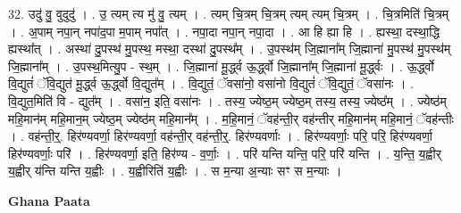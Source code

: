 \documentclass[17pt]{extarticle}
\begin{document}
32. उदु॑ वु॒ वुदुदु॑ । . उ॒ त्यम् त्य मु॑ वु॒ त्यम् । . त्यम् चि॒त्रम् चि॒त्रम् त्यम् त्यम् चि॒त्रम् । . चि॒त्रमिति॑ चि॒त्रम् । . अ॒पाम् नपा॒न् नपा॑द॒पा म॒पाम् नपा᳚त् । . नपा॒दा नपा॒न् नपा॒दा । . आ हि ह्या हि । . ह्यस्था॒ दस्था॒द्धि ह्यस्था᳚त् । . अस्था॑ दु॒पस्थ॑ मु॒पस्थ॒ मस्था॒ दस्था॑ दु॒पस्थ᳚म् । . उ॒पस्थ॑म् जि॒ह्माना᳚म् जि॒ह्माना॑ मु॒पस्थ॑ मु॒पस्थ॑म् जि॒ह्माना᳚म् । . उ॒पस्थ॒मित्यु॒प - स्थ॒म् । . जि॒ह्माना॑ मू॒र्द्ध्व ऊ॒र्द्ध्वो जि॒ह्माना᳚म् जि॒ह्माना॑ मू॒र्द्ध्वः । . ऊ॒र्द्ध्वो वि॒द्युतं॑ ॅवि॒द्युत॑ मू॒र्द्ध्व ऊ॒र्द्ध्वो वि॒द्युत᳚म् । . वि॒द्युतं॒ ॅवसा॑नो॒ वसा॑नो वि॒द्युतं॑ ॅवि॒द्युतं॒ ॅवसा॑नः । . वि॒द्युत॒मिति॑ वि - द्युत᳚म् । . वसा॑न॒ इति॒ वसा॑नः । . तस्य॒ ज्येष्ठ॒म् ज्येष्ठ॒म् तस्य॒ तस्य॒ ज्येष्ठ᳚म् । . ज्येष्ठ॑म् महि॒मान॑म् महि॒मान॒म् ज्येष्ठ॒म् ज्येष्ठ॑म् महि॒मान᳚म् । . म॒हि॒मानं॒ ॅवह॑न्ती॒र् वह॑न्तीर् महि॒मान॑म् महि॒मानं॒ ॅवह॑न्तीः । . वह॑न्ती॒र्॒. हिर॑ण्यवर्णा॒ हिर॑ण्यवर्णा॒ वह॑न्ती॒र् वह॑न्ती॒र्॒. हिर॑ण्यवर्णाः । . हिर॑ण्यवर्णाः॒ परि॒ परि॒ हिर॑ण्यवर्णा॒ हिर॑ण्यवर्णाः॒ परि॑ । . हिर॑ण्यवर्णा॒ इति॒ हिर॑ण्य - व॒र्णाः॒ । . परि॑ यन्ति यन्ति॒ परि॒ परि॑ यन्ति । . य॒न्ति॒ य॒ह्वीर् य॒ह्वीर् य॑न्ति यन्ति य॒ह्वीः । . य॒ह्वीरिति॑ य॒ह्वीः । . स म॒न्या अ॒न्याः सꣳ स म॒न्याः । \newline

\textbf{Ghana Paata } \newline
\end{document}
